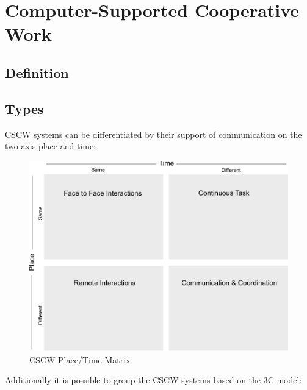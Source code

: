 
\section{Computer-Supported Cooperative Work}
\label{sec:cscw}

\subsection{Definition}
\label{sec:cscw_definition}


\subsection{Types}
\label{sec:cscw_types}

CSCW systems can be differentiated by their support of communication on the two axis place and time: \\

\begin{figure}[H]
 \centering
 \includegraphics[width=0.8\columnwidth]{images/cscw_time_place_matrix.pdf}
 \caption[CSCW Place/Time Matrix]{\gls{CSCW} Place/Time Matrix \citep{xx}}
\label{fig:images_cscw_time_place_matrix}
\end{figure}

Additionally it is possible to group the CSCW systems based on the 3C model: \\

